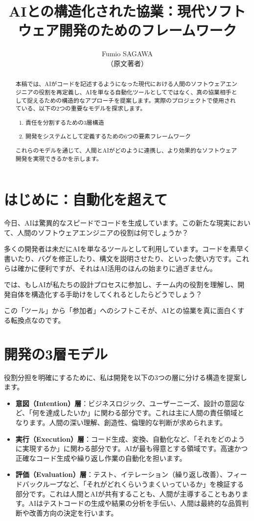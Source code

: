 \documentclass{article}
\title{AIとの構造化された協業：現代ソフトウェア開発のためのフレームワーク}
\author{ Fumio SAGAWA \\ （原文著者）}
\date{} %
\begin{document}
\maketitle

\begin{abstract}
本稿では、AIがコードを記述するようになった現代における人間のソフトウェアエンジニアの役割を再定義し、AIを単なる自動化ツールとしてではなく、真の協業相手として捉えるための構造的なアプローチを提案します。実際のプロジェクトで使用されている、以下の2つの重要なモデルを探求します。
\begin{enumerate}
    \item 責任を分割するための3層構造
    \item 開発をシステムとして定義するための6つの要素フレームワーク
\end{enumerate}
これらのモデルを通じて、人間とAIがどのように連携し、より効果的なソフトウェア開発を実現できるかを示します。
\end{abstract}

\section{はじめに：自動化を超えて}

今日、AIは驚異的なスピードでコードを生成しています。この新たな現実において、人間のソフトウェアエンジニアの役割は何でしょうか？

多くの開発者は未だにAIを単なるツールとして利用しています。コードを素早く書いたり、バグを修正したり、構文を説明させたり、といった使い方です。これらは確かに便利ですが、それはAI活用のほんの始まりに過ぎません。

では、もしAIが私たちの設計プロセスに参加し、チーム内の役割を理解し、開発自体を構造化する手助けをしてくれるとしたらどうでしょう？

この「ツール」から「参加者」へのシフトこそが、AIとの協業を真に面白くする転換点なのです。

\section{開発の3層モデル}

役割分担を明確にするために、私は開発を以下の3つの層に分ける構造を提案します。

\begin{itemize}
    \item \textbf{意図（Intention）層}：ビジネスロジック、ユーザーニーズ、設計の意図など、「何を達成したいか」に関わる部分です。これは主に人間の責任領域となります。人間の深い理解、創造性、倫理的な判断が求められます。
    \item \textbf{実行（Execution）層}：コード生成、変換、自動化など、「それをどのように実現するか」に関わる部分です。AIが最も得意とする領域です。高速かつ正確なコード生成や繰り返し作業の自動化を担います。
    \item \textbf{評価（Evaluation）層}：テスト、イテレーション（繰り返し改善）、フィードバックループなど、「それがどれくらいうまくいっているか」を検証する部分です。これは人間とAIが共有することも、人間が主導することもあります。AIはテストコードの生成や結果の分析を手伝い、人間は最終的な品質判断や改善方向の決定を行います。
\end{itemize}
\end{document}
